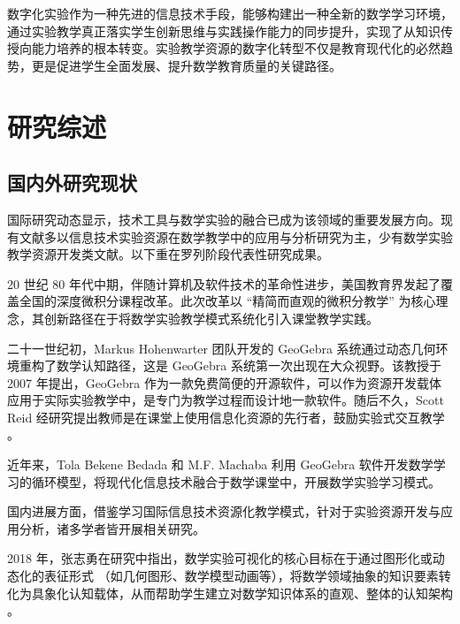 数字化实验作为一种先进的信息技术手段，能够构建出一种全新的数学学习环境，通过实验教学真正落实学生创新思维与实践操作能力的同步提升，实现了从知识传授向能力培养的根本转变。实验教学资源的数字化转型不仅是教育现代化的必然趋势，更是促进学生全面发展、提升数学教育质量的关键路径。


\section{研究综述}

\subsection{国内外研究现状}

国际研究动态显示，技术工具与数学实验的融合已成为该领域的重要发展方向。现有文献多以信息技术实验资源在数学教学中的应用与分析研究为主，少有数学实验教学资源开发类文献。以下重在罗列阶段代表性研究成果。

20 世纪 80 年代中期，伴随计算机及软件技术的革命性进步，美国教育界发起了覆盖全国的深度微积分课程改革。此次改革以 “精简而直观的微积分教学” 为核心理念，其创新路径在于将数学实验教学模式系统化引入课堂教学实践\cite{2004_陈晓瑛_国内外数学实验教学的现状分析与展望}。

二十一世纪初，Markus Hohenwarter 团队开发的 GeoGebra 系统通过动态几何环境重构了数学认知路径，这是 GeoGebra 系统第一次出现在大众视野\cite{2011_Velichova_Interactive_Maths_with_GeoGebra}。该教授于 2007 年提出，GeoGebra 作为一款免费简便的开源软件，可以作为资源开发载体应用于实际实验教学中，是专门为教学过程而设计地一款软件。随后不久，Scott Reid 经研究提出教师是在课堂上使用信息化资源的先行者，鼓励实验式交互教学 \cite{2002_Reid_The_integration_of_information_and_communication_technology_into_classroomteaching}。

近年来，Tola Bekene Bedada 和 M.F. Machaba 利用 GeoGebra 软件开发数学学习的循环模型，将现代化信息技术融合于数学课堂中，开展数学实验学习模式\cite{2024_Bedada_The_development_of_the_cycle_model_and_its_effect_on_mathematics_learning_using_GeoGebra_mathematical_software}。

国内进展方面，借鉴学习国际信息技术资源化教学模式，针对于实验资源开发与应用分析，诸多学者皆开展相关研究。

2018 年，张志勇在研究中指出，数学实验可视化的核心目标在于通过图形化或动态化的表征形式 （如几何图形、数学模型动画等），将数学领域抽象的知识要素转化为具象化认知载体，从而帮助学生建立对数学知识体系的直观、整体的认知架构 \cite{2018_张志勇_高中数学可视化教学}。

